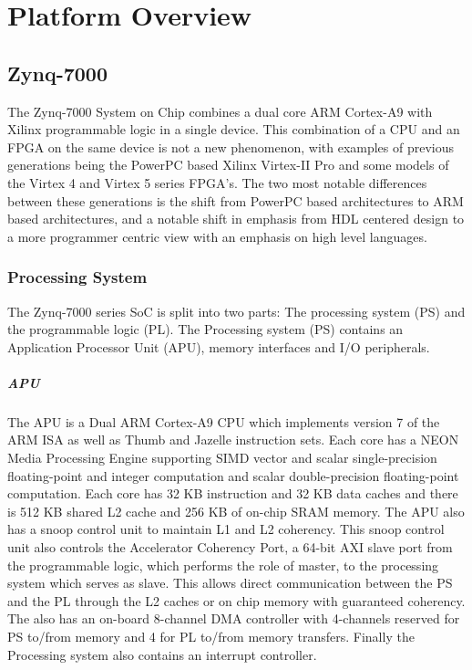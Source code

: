 


\chapter{Platform Overview}

\section{Zynq-7000}

The Zynq-7000 System on Chip combines a dual core ARM Cortex-A9 with Xilinx programmable logic in a single device. This combination of a CPU and an FPGA on the same device is not a new phenomenon, with examples of previous generations being the PowerPC based Xilinx Virtex-II Pro and some models of the Virtex 4 and Virtex 5 series FPGA's. The two most notable differences between these generations is the shift from PowerPC based architectures to ARM based architectures, and a notable shift in emphasis from HDL centered design to a more programmer centric view with an emphasis on high level languages. 
	

	\subsection{Processing System}
	The Zynq-7000 series SoC is split into two parts: The processing system (PS) and the programmable logic (PL). The Processing system (PS) contains an Application Processor Unit (APU), memory interfaces and I/O peripherals. 
	
		\paragraph{APU}
		The APU is a Dual ARM Cortex-A9 CPU which implements version 7 of the ARM ISA  as well as Thumb and Jazelle instruction sets. Each core has a NEON Media Processing Engine supporting SIMD vector and scalar single-precision floating-point and integer computation and scalar double-precision floating-point computation. Each core has 32 KB instruction and 32 KB data caches and there is 512 KB shared L2 cache and 256 KB of on-chip SRAM memory. The APU also has a snoop control unit to maintain L1 and L2 coherency. This snoop control unit also controls the Accelerator Coherency Port, a 64-bit AXI slave port from the programmable logic, which performs the role of master, to the processing system which serves as slave. This allows direct communication between the PS and the PL through the L2 caches or on chip memory with guaranteed coherency. The also has an on-board 8-channel DMA controller with 4-channels reserved for PS to/from memory and 4 for PL to/from memory transfers. Finally the Processing system also contains an interrupt controller.

